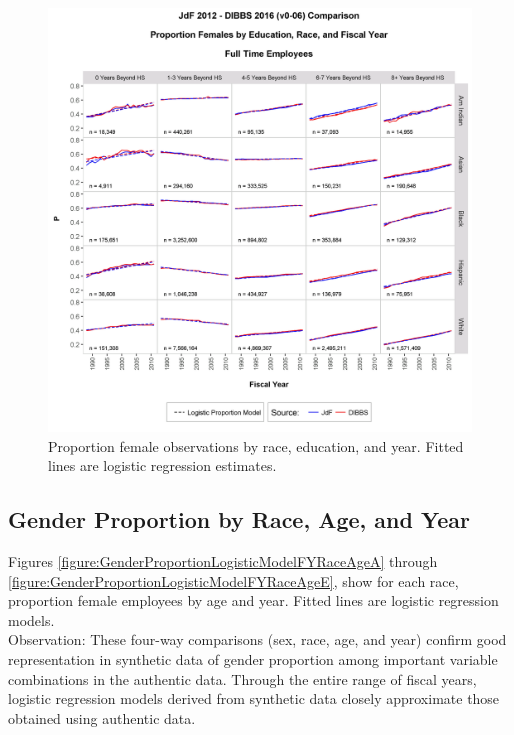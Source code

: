 \documentclass[10pt, letterpaper]{article}
\begin{document}
\begin{spacing}{1.0}
\begin{figure}[h]
    \centering
    \includegraphics[width=6.25in, trim={0 0 0 1in}, clip]{GenderProportionLogisticModelEducationRaceFYScaleFixedv0-06.png}
    \caption{Proportion female observations by race, education, and year.  Fitted lines are logistic regression estimates.}
    \label{figure:GenderProportionLogisticModelEducationRaceFYScaleFixedv0-06}
\end{figure}

\clearpage

\subsection{Gender Proportion by Race, Age, and Year}

Figures \ref{figure:GenderProportionLogisticModelFYRaceAgeA} through \ref{figure:GenderProportionLogisticModelFYRaceAgeE}, show for each race, proportion female employees by age and year.  Fitted lines are logistic regression models.\\

Observation:  These four-way comparisons (sex, race, age, and year) confirm good representation in synthetic data of gender proportion among important variable combinations in the authentic data.  Through the entire range of fiscal years, logistic regression models derived from synthetic data closely approximate those obtained using authentic data.\\


\end{spacing}
\end{document}

